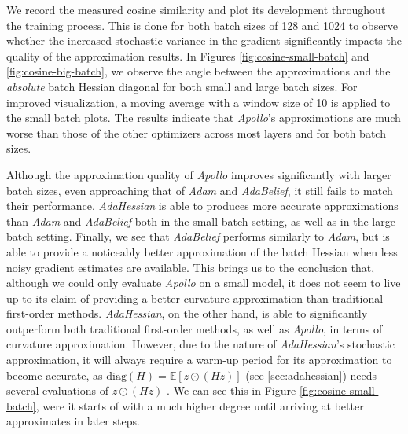 We record the measured cosine similarity and plot its development throughout the training process.
This is done for both batch sizes of 128 and 1024 to observe whether the increased stochastic variance in the gradient significantly impacts the quality of the approximation results.
In Figures \ref{fig:cosine-small-batch} and \ref{fig:cosine-big-batch}, we observe the angle between the approximations
and the \emph{absolute} batch Hessian diagonal for both small and large batch sizes.
For improved visualization, a moving average with a window size of 10 is applied to the small batch plots.
The results indicate that \emph{Apollo}'s approximations are much worse than those of the other optimizers across most layers and for both batch sizes.

Although the approximation quality of \emph{Apollo} improves significantly with larger batch sizes, even approaching that of \emph{Adam} and \emph{AdaBelief},
it still fails to match their performance.
\emph{AdaHessian} is able to produces more accurate approximations than \emph{Adam} and \emph{AdaBelief} both in the small batch setting,
as well as in the large batch setting.
Finally, we see that \emph{AdaBelief} performs similarly to \emph{Adam}, but is able to provide a noticeably better approximation of the batch Hessian when less noisy gradient estimates are available.
This brings us to the conclusion that, although we could only evaluate \emph{Apollo} on a small model,
it does not seem to live up to its claim of providing a better curvature approximation than traditional first-order methods.
\emph{AdaHessian}, on the other hand, is able to significantly outperform both traditional first-order methods, as well as \emph{Apollo},
in terms of curvature approximation.
However, due to the nature of \emph{AdaHessian}'s stochastic approximation, it will always require a warm-up period for its approximation to become accurate,
as $ \text{diag}(H) = \mathbb{E}[z \odot (Hz)]$ (see \ref{sec:adahessian}) needs several evaluations of $z \odot (Hz)$ . We can see this in Figure \ref{fig:cosine-small-batch},
were it starts of with a much higher degree until arriving at better approximates in later steps.


